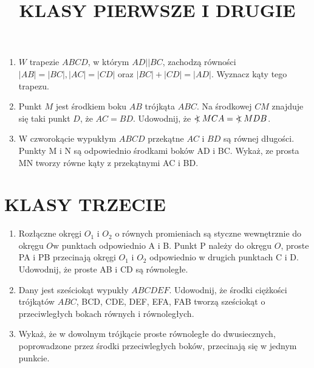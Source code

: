 \documentclass[10pt]{article}
\title{KLASY PIERWSZE I DRUGIE }
\author{}
\date{}
\newcommand\Varangle{\mathop{{<\!\!\!\!\!\text{\small)}}\:}\nolimits}
\begin{document}
\maketitle
\begin{enumerate}
  \item \(W\) trapezie \(A B C D\), w którym \(A D|\mid B C\), zachodzą równości \(| A B|=|B C|,|A C|=|C D|\) oraz \(|B C|+|C D|=|A D|\). Wyznacz kąty tego trapezu.
  \item Punkt \(M\) jest środkiem boku \(A B\) trójkąta \(A B C\). Na środkowej \(C M\) znajduje się taki punkt \(D\), że \(A C=B D\). Udowodnij, że \(\Varangle M C A=\Varangle M D B\).
  \item W czworokącie wypukłym \(A B C D\) przekątne \(A C\) i \(B D\) są równej długości. Punkty M i N są odpowiednio środkami boków AD i BC. Wykaż, ze prosta MN tworzy równe kąty z przekątnymi AC i BD.
\end{enumerate}

\section*{KLASY TRZECIE}
\begin{enumerate}
  \item Rozłączne okręgi \(O_{1}\) i \(O_{2}\) o równych promieniach są styczne wewnętrznie do okręgu \(O \mathrm{w}\) punktach odpowiednio A i B. Punkt P należy do okręgu \(O\), proste PA i PB przecinają okręgi \(O_{1}\) i \(O_{2}\) odpowiednio w drugich punktach C i D. Udowodnij, że proste AB i CD są równoległe.
  \item Dany jest sześciokąt wypukły \(A B C D E F\). Udowodnij, że środki ciężkości trójkątów \(A B C\), BCD, CDE, DEF, EFA, FAB tworzą sześciokąt o przeciwległych bokach równych i równoległych.
  \item Wykaż, że w dowolnym trójkącie proste równoległe do dwusiecznych, poprowadzone przez środki przeciwległych boków, przecinają się w jednym punkcie.
\end{enumerate}
\end{document}

